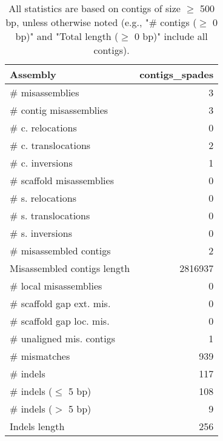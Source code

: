 \documentclass[12pt,a4paper]{article}
\begin{document}
\begin{table}[ht]
\begin{center}
\caption{All statistics are based on contigs of size $\geq$ 500 bp, unless otherwise noted (e.g., "\# contigs ($\geq$ 0 bp)" and "Total length ($\geq$ 0 bp)" include all contigs).}
\begin{tabular}{|l*{1}{|r}|}
\hline
Assembly & contigs\_spades \\ \hline
\# misassemblies & 3 \\ \hline
\hspace{2mm}\# contig misassemblies & 3 \\ \hline
\hspace{5mm}\# c. relocations & 0 \\ \hline
\hspace{5mm}\# c. translocations & 2 \\ \hline
\hspace{5mm}\# c. inversions & 1 \\ \hline
\hspace{2mm}\# scaffold misassemblies & 0 \\ \hline
\hspace{5mm}\# s. relocations & 0 \\ \hline
\hspace{5mm}\# s. translocations & 0 \\ \hline
\hspace{5mm}\# s. inversions & 0 \\ \hline
\# misassembled contigs & 2 \\ \hline
Misassembled contigs length & 2816937 \\ \hline
\# local misassemblies & 0 \\ \hline
\# scaffold gap ext. mis. & 0 \\ \hline
\# scaffold gap loc. mis. & 0 \\ \hline
\# unaligned mis. contigs & 1 \\ \hline
\# mismatches & 939 \\ \hline
\# indels & 117 \\ \hline
\hspace{5mm}\# indels ($\leq$ 5 bp) & 108 \\ \hline
\hspace{5mm}\# indels ($>$ 5 bp) & 9 \\ \hline
Indels length & 256 \\ \hline
\end{tabular}
\end{center}
\end{table}
\end{document}
